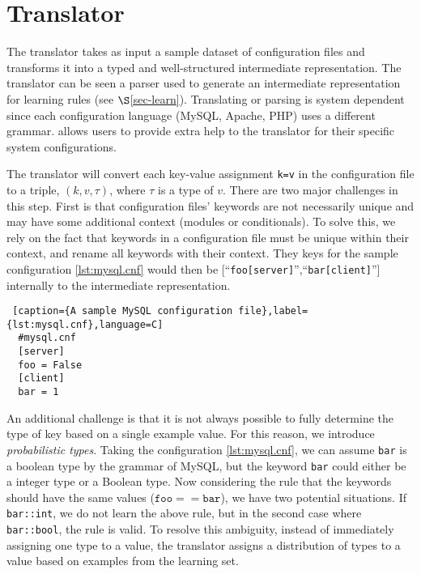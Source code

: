 
\section{Translator}
\label{sec-trans}

The translator takes as input a sample dataset of configuration files and transforms it into a typed and well-structured intermediate representation.
The translator can be seen a parser used to generate an intermediate representation for learning rules (see $\S$\ref{sec-learn}).
Translating or parsing is system dependent since each configuration language (MySQL, Apache, PHP) uses a different grammar.
\app allows users to provide extra help to the translator for their specific system configurations.

The translator will convert each key-value assignment {\tt k=v} in the configuration file to a triple, $(k, v, \tau)$, where $\tau$ is a type of $v$. 
There are two major challenges in this step.
First is that configuration files' keywords are not necessarily unique and may have some additional context (modules or conditionals).
To solve this, we rely on the fact that keywords in a configuration file must be unique within their context, and rename all keywords with their context.
They keys for the sample configuration \ref{lst:mysql.cnf} would then be [``{\tt foo[server]}'',``{\tt bar[client]}''] internally to the intermediate representation.


\begin{lstlisting} [caption={A sample MySQL configuration file},label={lst:mysql.cnf},language=C]
  #mysql.cnf
  [server]
  foo = False
  [client]
  bar = 1
\end{lstlisting}

An additional challenge is that it is not always possible to fully determine the type of key based on a single example value. 
For this reason, we introduce {\emph {probabilistic types}}.
Taking the configuration \ref{lst:mysql.cnf}, we can assume {\tt bar} is a boolean type by the grammar of MySQL,
  but the keyword {\tt bar} could either be a integer type or a Boolean type.
Now considering the rule that the keywords should have the same values ($\texttt{foo}==\texttt{bar}$), we have two potential situations.
If {\tt bar::int}, we do not learn the above rule, but in the second case where {\tt bar::bool}, the rule is valid.
To resolve this ambiguity, instead of immediately assigning one type to a value, the translator assigns a distribution of types to a value based on examples from the learning set.

